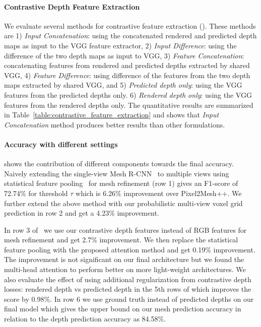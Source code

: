 \paragraph{Contrastive Depth Feature Extraction}
We evaluate several methods for contrastive feature extraction (). These methods are
1) \emph{Input Concatenation}: using the concatenated rendered and predicted depth maps as input to the VGG feature extractor,
2) \emph{Input Difference}: using the difference of the two depth maps as input to VGG,
3) \emph{Feature Concatenation}: concatenating features from rendered and predicted depths extracted by shared VGG,
4) \emph{Feature Difference}: using difference of the features from the two depth maps extracted by shared VGG, and
5) \emph{Predicted depth only}: using the VGG features from the predicted depths only.
6) \emph{Rendered depth only}: using the VGG features from the rendered depths only.
The quantitative results are summarized in Table~\ref{table:contrastive_feature_extraction} and shows that \emph{Input Concatenation} method produces better results than other formulations.


\vspace{-4mm}
\paragraph{Accuracy with different settings}
 shows the contribution of different components towards the final accuracy. Naively extending the single-view Mesh R-CNN~\cite{gkioxari2019meshrcnn} to multiple views using statistical feature pooling~\cite{wen2019pixel2mesh++} for mesh refinement (row 1) gives an F1-score of 72.74\% for threshold $\tau$ which is 6.26\% improvement over Pixel2Mesh++.
We further extend the above method with our probabilistic multi-view voxel grid prediction in row 2 and get a 4.23\% improvement.

In row 3 of~ we use our contrastive depth features instead of RGB features for mesh refinement and get 2.7\% improvement.
We then replace the statistical feature pooling with the proposed attention method and get 0.19\% improvement.
The improvement is not significant on our final architecture but we found the multi-head attention to perform better on more light-weight architectures.
We also evaluate the effect of using additional regularization from contrastive depth losses: rendered depth vs predicted depth in the 5th rows of which improves the score by 0.98\%.
In row 6 we use ground truth instead of predicted depths on our final model which gives the upper bound on our mesh prediction accuracy in relation to the depth prediction accuracy as 84.58\%.

